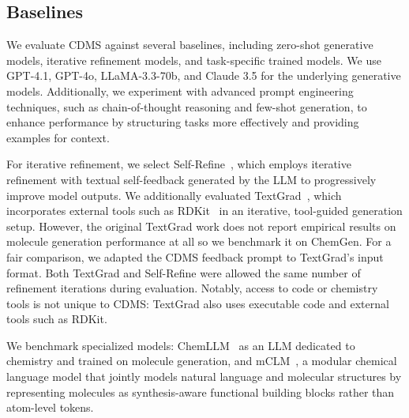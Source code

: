 \documentclass[10pt]{article} %
\begin{document}

    \subsection{Baselines}
    \label{sec:baselines}
    We evaluate CDMS  against several baselines, including zero-shot generative models, iterative refinement models, and task-specific trained models.
    We use GPT-4.1, GPT-4o, LLaMA-3.3-70b, and Claude 3.5 for the underlying generative models. Additionally, we experiment with advanced prompt engineering techniques, such as chain-of-thought reasoning and few-shot generation, to enhance performance by structuring tasks more effectively and providing examples for context.

    For iterative refinement, we select Self-Refine~\cite{madaan2024self}, which employs iterative refinement with textual self-feedback generated by the LLM to progressively improve model outputs. We additionally evaluated TextGrad~\cite{yuksekgonul2025optimizing}, which incorporates external tools such as RDKit~\cite{rdkit} in an iterative, tool-guided generation setup. However, the original TextGrad work does not report empirical results on molecule generation performance at all so we benchmark it on ChemGen. For a fair comparison, we adapted the CDMS feedback prompt to TextGrad’s input format. Both TextGrad and Self-Refine were allowed the same number of refinement iterations during evaluation. Notably, access to code or chemistry tools is not unique to CDMS: TextGrad also uses executable code and external tools such as RDKit.

    We benchmark specialized models: ChemLLM~\cite{zhang2024chemllm} as an LLM dedicated to chemistry and trained on molecule generation, and mCLM~\cite{edwards2025mclmmodularchemicallanguage}, a modular chemical language model that jointly models natural language and molecular structures by representing molecules as synthesis-aware functional building blocks rather than atom-level tokens.
\end{document}
